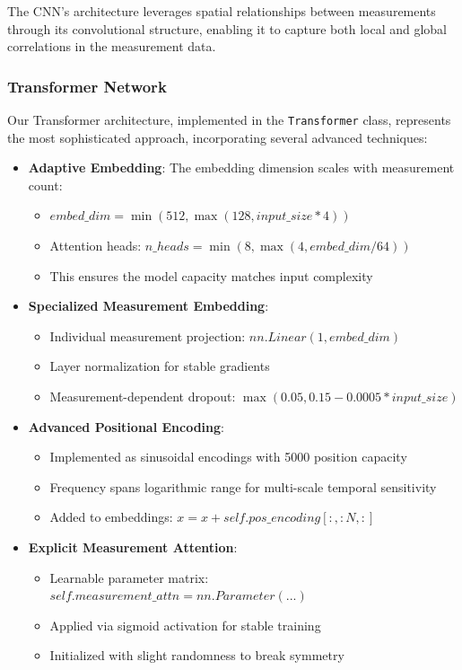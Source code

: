 \documentclass{optica-article}
\begin{document}
The CNN's architecture leverages spatial relationships between measurements through its convolutional structure, enabling it to capture both local and global correlations in the measurement data.

\subsubsection{Transformer Network}

Our Transformer architecture, implemented in the \texttt{Transformer} class, represents the most sophisticated approach, incorporating several advanced techniques:

\begin{itemize}
\item \textbf{Adaptive Embedding}: The embedding dimension scales with measurement count:
\begin{itemize}
\item $embed\_dim = \min(512, \max(128, input\_size * 4))$
\item Attention heads: $n\_heads = \min(8, \max(4, embed\_dim / 64))$
\item This ensures the model capacity matches input complexity
\end{itemize}

\item \textbf{Specialized Measurement Embedding}:
\begin{itemize}
\item Individual measurement projection: $nn.Linear(1, embed\_dim)$
\item Layer normalization for stable gradients
\item Measurement-dependent dropout: $\max(0.05, 0.15 - 0.0005 * input\_size)$
\end{itemize}

\item \textbf{Advanced Positional Encoding}:
\begin{itemize}
\item Implemented as sinusoidal encodings with 5000 position capacity
\item Frequency spans logarithmic range for multi-scale temporal sensitivity
\item Added to embeddings: $x = x + self.pos\_encoding[:, :N, :]$
\end{itemize}

\item \textbf{Explicit Measurement Attention}:
\begin{itemize}
\item Learnable parameter matrix: $self.measurement\_attn = nn.Parameter(...)$
\item Applied via sigmoid activation for stable training
\item Initialized with slight randomness to break symmetry
\end{itemize}


\end{itemize}
\end{document}
